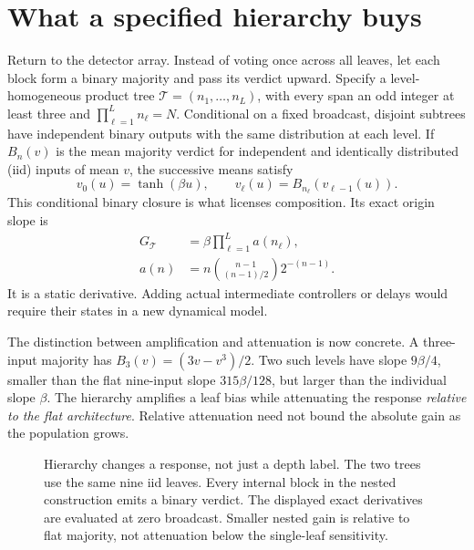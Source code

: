 \section{What a specified hierarchy buys}
\label{hrec:sec:hierarchy}
Return to the detector array. Instead of voting once across all leaves, let each block form a binary majority and pass its verdict upward. Specify a level-homogeneous product tree
\(\mathcal T=(n_1,\ldots,n_L)\), with every span an odd integer at least three and
\(\prod_{\ell=1}^L n_\ell=N\). Conditional on a fixed broadcast, disjoint subtrees have independent binary outputs with the same distribution at each level. If \(B_n(v)\) is the mean majority verdict for independent and identically distributed (iid) inputs of mean \(v\), the successive means satisfy
\begin{equation}
 v_0(u)=\tanh(\beta u),\qquad
 v_\ell(u)=B_{n_\ell}(v_{\ell-1}(u)).
 \label{hrec:eq:tree}
\end{equation}
This conditional binary closure is what licenses composition. Its exact origin slope is
\begin{equation}
 \begin{aligned}
 G_{\mathcal T}&=\beta\prod_{\ell=1}^L a(n_\ell),\\
 a(n)&=n\binom{n-1}{(n-1)/2}2^{-(n-1)}.
 \end{aligned}
 \label{hrec:eq:tree-slope}
\end{equation}
It is a static derivative. Adding actual intermediate controllers or delays would require their states in a new dynamical model.

The distinction between amplification and attenuation is now concrete. A three-input majority has \(B_3(v)=(3v-v^3)/2\). Two such levels have slope \(9\beta/4\), smaller than the flat nine-input slope \(315\beta/128\), but larger than the individual slope \(\beta\). The hierarchy amplifies a leaf bias while attenuating the response \emph{relative to the flat architecture}. Relative attenuation need not bound the absolute gain as the population grows.

\begin{figure}[t]
 \centering
 \caption{Hierarchy changes a response, not just a depth label. The two trees use the same nine iid leaves. Every internal block in the nested construction emits a binary verdict. The displayed exact derivatives are evaluated at zero broadcast. Smaller nested gain is relative to flat majority, not attenuation below the single-leaf sensitivity.}
 \label{hrec:fig:trees}
\end{figure}

